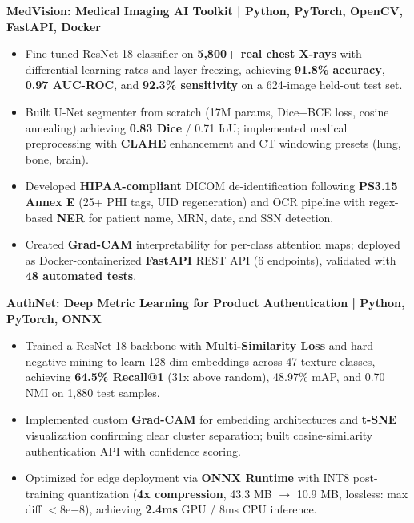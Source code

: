 \documentclass[10pt]{article}        %
\begin{document}
\textbf{MedVision: Medical Imaging AI Toolkit | Python, PyTorch, OpenCV, FastAPI, Docker} \hfill \href{https://github.com/OmTilwar/medvision}{\faGithub} \\
\vspace{-9pt}
\begin{itemize}
  \item Fine-tuned ResNet-18 classifier on \textbf{\textcolor{NavyBlue}{5,800+ real chest X-rays}} with differential learning rates and layer freezing, achieving \textbf{\textcolor{NavyBlue}{91.8\% accuracy}}, \textbf{\textcolor{NavyBlue}{0.97 AUC-ROC}}, and \textbf{\textcolor{NavyBlue}{92.3\% sensitivity}} on a 624-image held-out test set.
  \item Built U-Net segmenter from scratch (17M params, Dice+BCE loss, cosine annealing) achieving \textbf{\textcolor{NavyBlue}{0.83 Dice}} / 0.71 IoU; implemented medical preprocessing with \textbf{\textcolor{NavyBlue}{CLAHE}} enhancement and CT windowing presets (lung, bone, brain).
  \item Developed \textbf{\textcolor{NavyBlue}{HIPAA-compliant}} DICOM de-identification following \textbf{\textcolor{NavyBlue}{PS3.15 Annex E}} (25+ PHI tags, UID regeneration) and OCR pipeline with regex-based \textbf{\textcolor{NavyBlue}{NER}} for patient name, MRN, date, and SSN detection.
  \item Created \textbf{\textcolor{NavyBlue}{Grad-CAM}} interpretability for per-class attention maps; deployed as Docker-containerized \textbf{\textcolor{NavyBlue}{FastAPI}} REST API (6 endpoints), validated with \textbf{\textcolor{NavyBlue}{48 automated tests}}.
\end{itemize}

\textbf{AuthNet: Deep Metric Learning for Product Authentication | Python, PyTorch, ONNX} \hfill \href{https://github.com/OmTilwar/authnet}{\faGithub} \\
\vspace{-9pt}
\begin{itemize}
  \item Trained a ResNet-18 backbone with \textbf{\textcolor{NavyBlue}{Multi-Similarity Loss}} and hard-negative mining to learn 128-dim embeddings across 47 texture classes, achieving \textbf{\textcolor{NavyBlue}{64.5\% Recall@1}} (31x above random), 48.97\% mAP, and 0.70 NMI on 1,880 test samples.
  \item Implemented custom \textbf{\textcolor{NavyBlue}{Grad-CAM}} for embedding architectures and \textbf{\textcolor{NavyBlue}{t-SNE}} visualization confirming clear cluster separation; built cosine-similarity authentication API with confidence scoring.
  \item Optimized for edge deployment via \textbf{\textcolor{NavyBlue}{ONNX Runtime}} with INT8 post-training quantization (\textbf{\textcolor{NavyBlue}{4x compression}}, 43.3 MB $\rightarrow$ 10.9 MB, lossless: max diff $<8\mathrm{e}{-8}$), achieving \textbf{\textcolor{NavyBlue}{2.4ms}} GPU / 8ms CPU inference.
\end{itemize}
\end{document}
